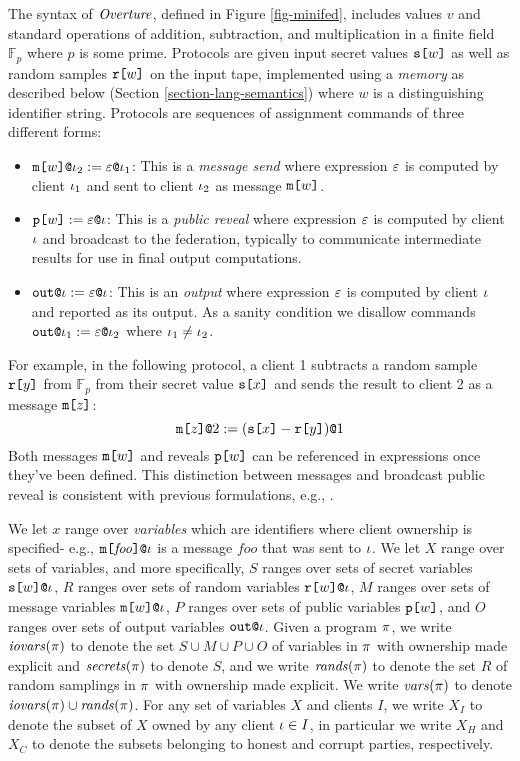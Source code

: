 The syntax of $\mathit{Overture}$, defined in Figure \ref{fig-minifed},
includes values $v$ and standard operations of addition, subtraction,
and multiplication in a finite field $\mathbb{F}_p$ where $p$ is some
prime.  Protocols are given input secret values $\texttt{s[}w\texttt{]}$ as well
as random samples $\texttt{r[}w\texttt{]}$ on the input tape, implemented using a
\emph{memory} as described below (Section
\ref{section-lang-semantics}) where $w$ is a distinguishing 
identifier string. Protocols are sequences of assignment commands of three
different forms:
\begin{itemize}
\item $\texttt{m[}w\texttt{]}\texttt{@}\iota_2 := \varepsilon\texttt{@}\iota_1$: This
  is a \emph{message send} where expression $\varepsilon$ is computed
  by client $\iota_1$ and sent to client $\iota_2$ as message
  $\texttt{m[}w\texttt{]}$.
\item $\texttt{p[}w\texttt{]} := \varepsilon\texttt{@}\iota$: This
  is a \emph{public reveal} where expression $\varepsilon$ is computed
  by client $\iota$ and broadcast to the federation, typically
  to communicate intermediate results for use in final output
  computations.
\item $\texttt{out}\texttt{@}\iota := \varepsilon\texttt{@}\iota$: This
  is an \emph{output} where expression $\varepsilon$ is computed
  by client $\iota$ and reported as its output. As a
  sanity condition we disallow commands
  $\texttt{out}\texttt{@}\iota_1 := \varepsilon\texttt{@}\iota_2$ where $\iota_1\ne\iota_2$.
\end{itemize}
For example, in the following protocol, a client 1
subtracts a random sample $\texttt{r[}y\texttt{]}$ from $\mathbb{F}_p$ from their
secret value $\texttt{s[}x\texttt{]}$ and sends the result to client
2 as a message $\texttt{m[}z\texttt{]}$:
$$
\texttt{m[}z\texttt{]}\texttt{@}2 := (\texttt{s[}x\texttt{]} - \texttt{r[}y\texttt{]})\texttt{@}1
$$
Both messages $\texttt{m[}w\texttt{]}$ and reveals $\texttt{p[}w\texttt{]}$ can be
referenced in expressions once they've been defined.
This distinction between messages and broadcast public
reveal is consistent with previous formulations, e.g.,
\cite{6266151}.

We let $x$ range over \emph{variables} which are identifiers where
client ownership is specified- e.g.,
$\texttt{m[}\mathit{foo}\texttt{]}\texttt{@}\iota$ is a message $\mathit{foo}$ that
was sent to $\iota$. We let $X$ range over sets of variables, and more
specifically, $S$ ranges over sets of secret variables
$\texttt{s[}w\texttt{]}\texttt{@}\iota$, $R$ ranges over sets of random variables
$\texttt{r[}w\texttt{]}\texttt{@}\iota$, $M$ ranges over sets of message variables
$\texttt{m[}w\texttt{]}\texttt{@}\iota$, $P$ ranges over sets of public variables
$\texttt{p[}w\texttt{]}$, and $O$ ranges over sets of output variables $\texttt{out}\texttt{@}\iota$.
Given a program $\pi$, we write $\mathit{iovars}(\pi)$ to denote the set $S
\cup M \cup P \cup O$ of variables in $\pi$ with ownership made
explicit and $\mathit{secrets}(\pi)$ to denote $S$, and we write
$\mathit{rands}(\pi)$ to denote the set $R$ of random samplings in $\pi$
with ownership made explicit. We write $\mathit{vars}(\pi)$ to denote
$\mathit{iovars}(\pi) \cup \mathit{rands}(\pi)$. For any set of variables $X$ and
clients $I$, we write $X_I$ to denote the subset of $X$ owned by any
client $\iota \in I$, in particular we write $X_H$ and $X_C$ to denote the
subsets belonging to honest and corrupt parties, respectively.

